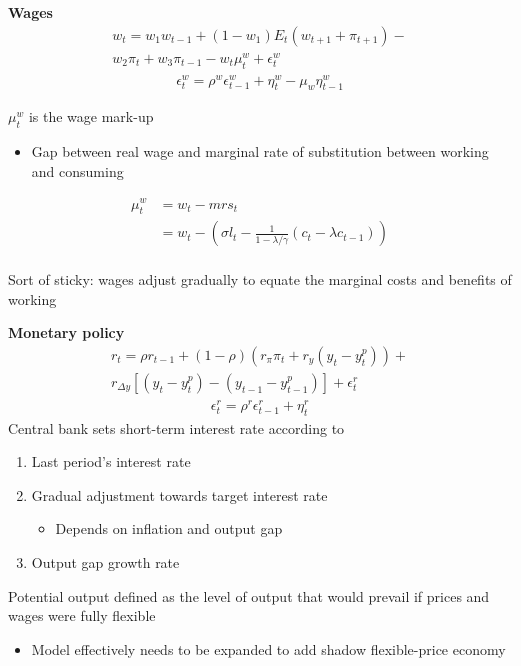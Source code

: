 \documentclass{beamer}
\begin{document}
\begin{frame}
 \textbf{Wages}  
\begin{align}
  w_t = w_1w_{t-1} + (1-w_1)E_t(w_{t+1} + \pi_{t+1}) - \\ \nonumber
  w_2\pi_t + w_3\pi_{t-1} - w_t\mu_t^w + \epsilon_t^w   
\end{align}
\begin{align}
  \epsilon_t^w = \rho^w \epsilon^w_{t-1} + \eta_t^w - \mu_w \eta_{t-1}^w
\end{align}
\end{frame}

\begin{frame}
$\mu_t^w$ is the wage mark-up 
\begin{itemize}
  \item Gap between real wage and marginal rate of substitution between working and consuming
\end{itemize}
\begin{align}
  \mu_t^w &= w_t - mrs_t\\
  &= w_t - \left( \sigma l_t - \frac{1}{1-\lambda/\gamma} (c_t - \lambda c_{t-1}) \right)  
\end{align}
\\ \medskip
 Sort of sticky: wages adjust gradually to equate the marginal costs and benefits of working
\end{frame}

\begin{frame}
  \textbf{Monetary policy}
\begin{align}
  r_t = \rho r_{t-1} + (1-\rho)(r_\pi \pi_t + r_y(y_t - y_t^p)) + \\ \nonumber r_{\Delta y} [(y_t - y_t^p) - (y_{t-1} - y_{t-1}^p)] + \epsilon_t^r 
\end{align}
\begin{align}  \epsilon_t^r = \rho^r \epsilon^r_{t-1} + \eta_t^r \end{align}
\medskip
Central bank sets short-term interest rate according to
\begin{enumerate}
  \item Last period's interest rate
  \item Gradual adjustment towards target interest rate
  \begin{itemize}
    \item Depends on inflation and output gap
  \end{itemize}
  \item Output gap growth rate
\end{enumerate}
\medskip
Potential output defined as the level of output that would prevail if prices and wages were fully flexible
\begin{itemize}
  \item  Model effectively needs to be expanded to add shadow flexible-price economy
\end{itemize}
\end{frame}
\end{document}
